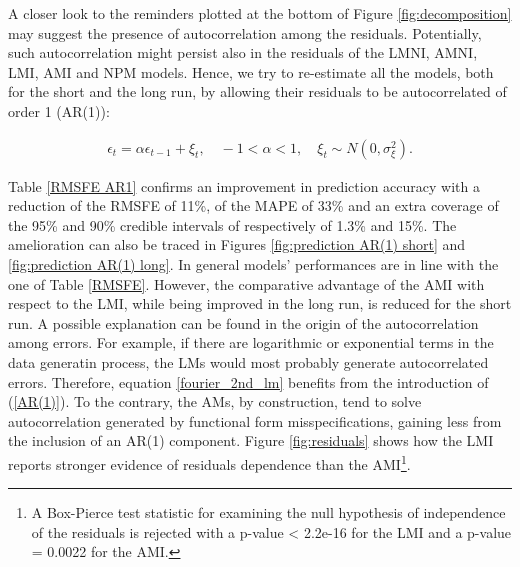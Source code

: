 \documentclass{article}\usepackage[]{graphicx}\usepackage[]{color}
\begin{document}
A closer look to the reminders plotted at the bottom of Figure \ref{fig:decomposition} may suggest the presence of autocorrelation among the residuals. Potentially, such autocorrelation might persist also in the residuals of the LMNI, AMNI, LMI, AMI and NPM models. Hence, we try to re-estimate all the models, both for the short and the long run, by allowing their residuals to be autocorrelated of order 1 (AR(1)):

\begin{align}\label{AR(1)}
\epsilon_{t} = \alpha \epsilon_{t-1} + \xi_{t}, \quad -1 < \alpha < 1, \quad \xi_{t} \sim N(0,\sigma_{\xi}^2).
\end{align}

Table \ref{RMSFE AR1} confirms an improvement in prediction accuracy with a reduction of the RMSFE of 11\%, of the MAPE of 33\% and an extra coverage of the 95\% and 90\% credible intervals of respectively of 1.3\% and 15\%. The amelioration can also be traced in Figures \ref{fig:prediction AR(1) short} and \ref{fig:prediction AR(1) long}. In general models' performances are in line with the one of Table \ref{RMSFE}. However, the comparative advantage of the AMI with respect to the LMI, while being improved in the long run, is reduced for the short run. 
A possible explanation can be found in the origin of the autocorrelation among errors. For example, if there are logarithmic or exponential terms in the data generatin process, the LMs would most probably generate autocorrelated errors. Therefore, equation \ref{fourier_2nd_lm} benefits from the introduction of (\ref{AR(1)}). To the contrary, the AMs, by construction, tend to solve autocorrelation generated by functional form misspecifications, gaining less from the inclusion of an AR(1) component. Figure \ref{fig:residuals} shows how the LMI reports stronger evidence of residuals dependence than the AMI\footnote{
A Box-Pierce test statistic for examining the null hypothesis of independence of the residuals is rejected with a p-value < 2.2e-16 for the LMI and a p-value = 0.0022 for the AMI.
}. 

\end{document}
